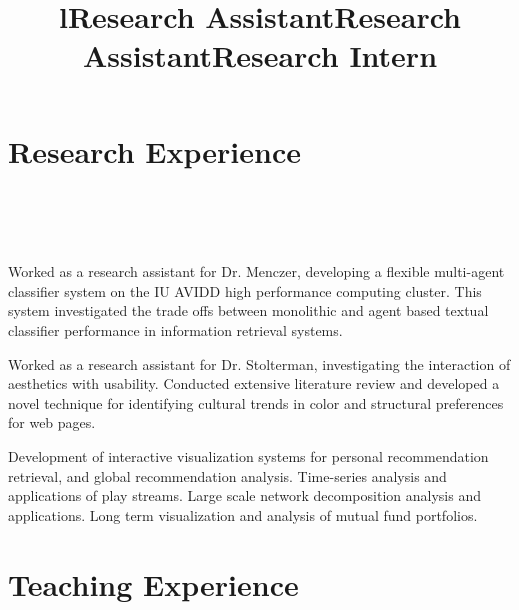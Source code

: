 \documentclass[overlapped,line,letterpaper]{res}
\begin{document}
\begin{resume}
\begin{position}
\end{position}

\section{\bf Research Experience}

\begin{format}
\title{l}\\
\\
\body\\
\end{format}

\title{Research Assistant}
\title{Research Assistant}
\begin{position}
Worked as a research assistant for Dr. Menczer, developing a flexible multi-agent classifier system on the IU AVIDD high performance computing cluster.  This system investigated the trade offs between monolithic and agent based textual classifier performance in information retrieval systems.
\end{position}

\begin{position}
Worked as a research assistant for Dr. Stolterman, investigating the interaction of aesthetics with usability.  Conducted extensive literature review and developed a novel technique for identifying cultural trends in color and structural preferences for web pages.
\end{position}


\title{Research Intern}
\begin{position}
  Development of interactive visualization systems for personal recommendation retrieval, and global recommendation analysis.  Time-series analysis and applications of play streams.  Large scale network decomposition analysis and applications.  Long term visualization and analysis of mutual fund portfolios.
\end{position}


\section{\bf Teaching Experience}


\end{resume}
\end{document}
